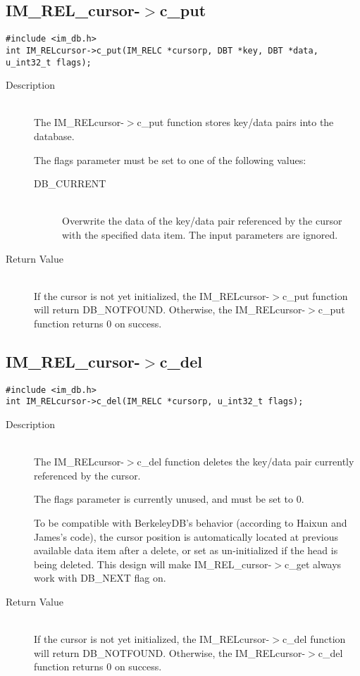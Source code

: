 \documentclass[11pt]{article}
\def\cdf{\sf }
\def\cdf{\sf }
\newcommand{\IMRELcursor}{{\small{\cdf IM\_REL\_cursor}}}
\newcommand{\DBNOTFOUND}{{\small{\cdf DB\_NOTFOUND}}}
\newcommand{\DBNEXT}{{\small{\cdf DB\_NEXT}}}
\newcommand{\DBCURRENT}{{\small{\cdf DB\_CURRENT}}}
\begin{document}
\newpage
\subsection{{\IMRELcursor}-$>$c\_put}
\begin{verbatim}
#include <im_db.h>
int IM_RELcursor->c_put(IM_RELC *cursorp, DBT *key, DBT *data, u_int32_t flags);
\end{verbatim}
\begin{description}
\item[Description]\ \\

  The IM\_RELcursor-$>$c\_put function stores key/data pairs into the
  database.

  The flags parameter must be set to one of the following values: 
  \begin{description}
  \item[{\DBCURRENT}]\ \\
    Overwrite the data of the key/data pair referenced by the cursor
    with the specified data item. The input parameters are ignored. 
  \end{description}

\item[Return Value]\ \\
  If the cursor is not yet initialized, the IM\_RELcursor-$>$c\_put
  function will return {\DBNOTFOUND}. Otherwise, the
  IM\_RELcursor-$>$c\_put function returns 0 on success. 
\end{description}

\newpage
\subsection{{\IMRELcursor}-$>$c\_del}
\begin{verbatim}
#include <im_db.h>
int IM_RELcursor->c_del(IM_RELC *cursorp, u_int32_t flags);
\end{verbatim}
\begin{description}
\item[Description]\ \\

  The IM\_RELcursor-$>$c\_del function deletes the key/data pair currently
  referenced by the cursor. 

  The flags parameter is currently unused, and must be set to 0. 

  To be compatible with BerkeleyDB's behavior (according to Haixun and
  James's code),  the cursor position is automatically located at
  previous available data item after a delete, or set as
  un-initialized if the head is being deleted.  This design will make
  {\IMRELcursor}-$>$c_get always work with {\DBNEXT} flag on.

\item[Return Value]\ \\
  If the cursor is not yet initialized, the IM\_RELcursor-$>$c\_del
  function will return {\DBNOTFOUND}. Otherwise, the
  IM\_RELcursor-$>$c\_del function returns 0 on success. 
\end{description}
\end{document}
